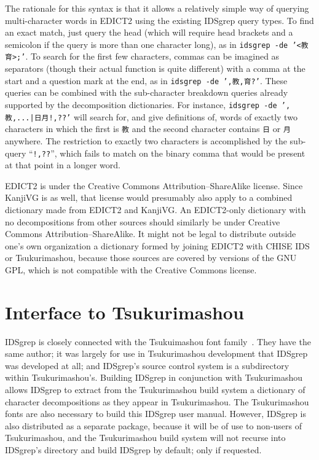 \documentclass[twocolumn]{report}
\begin{document}
The rationale for this syntax is that it allows a relatively simple way of
querying multi-character words in EDICT2 using the existing IDSgrep query
types.  To find an exact match, just query the head (which will require head
brackets and a semicolon if the query is more than one character long), as
in \texttt{idsgrep -de '<教育>;'}.  To search for the first few characters,
commas can be imagined as separators (though their actual function is quite
different) with a comma at the start and a question mark at the end, as in
\texttt{idsgrep -de ',教,育?'}.  These queries can be combined with the
sub-character breakdown queries already supported by the decomposition
dictionaries.  For instance, \texttt{idsgrep -de ',教,...|日月!,??'} will
search for, and give definitions of, words of exactly two characters in
which the first is \texttt{教} and the second character contains \texttt{日}
or \texttt{月} anywhere.  The restriction to exactly two characters is
accomplished by the sub-query ``\texttt{!,??}'', which fails to match on the
binary comma that would be present at that point in a longer word.

EDICT2 is under the Creative Commons Attribution--ShareAlike license.  Since
KanjiVG is as well, that license would presumably also apply to a combined
dictionary made from EDICT2 and KanjiVG.  An EDICT2-only dictionary with no
decompositions from other sources should similarly be under Creative Commons
Attribution--ShareAlike.  It might not be legal to distribute outside one's
own organization a dictionary formed by joining EDICT2 with CHISE IDS or
Tsukurimashou, because those sources are covered by versions of the GNU GPL,
which is not compatible with the Creative Commons license.


\section{Interface to Tsukurimashou}

IDSgrep is closely connected with the Tsukuimashou font
family~\cite{Tsukurimashou}.  They have the same author; it was largely for
use in Tsukurimashou development that IDSgrep was developed at all; and
IDSgrep's source control system is a subdirectory within Tsukurimashou's. 
Building IDSgrep in conjunction with Tsukurimashou allows IDSgrep to extract
from the Tsukurimashou build system a dictionary of character decompositions
as they appear in Tsukurimashou.  The Tsukurimashou fonts are also necessary
to build this IDSgrep user manual.  However, IDSgrep is also distributed as a
separate package, because it will be of use to non-users of Tsukurimashou,
and the Tsukurimashou build system will not recurse into IDSgrep's directory
and build IDSgrep by default; only if requested.
\end{document}
